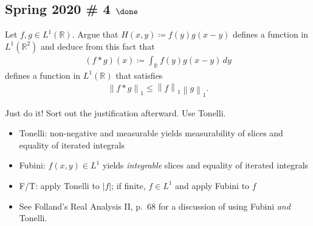 \hypertarget{spring-2020-4-done}{%
\subsection{\texorpdfstring{Spring 2020 \# 4
\(\done\)}{Spring 2020 \# 4 \textbackslash done}}\label{spring-2020-4-done}}

Let \(f, g\in L^1({\mathbb{R}})\). Argue that
\(H(x, y) \coloneqq f(y) g(x-y)\) defines a function in
\(L^1({\mathbb{R}}^2)\) and deduce from this fact that
\begin{align*}
(f\ast g)(x) \coloneqq\int_{\mathbb{R}}f(y) g(x-y) \,dy
\end{align*}
defines a function in \(L^1({\mathbb{R}})\) that satisfies
\begin{align*}
{\left\lVert {f\ast g} \right\rVert}_1 \leq {\left\lVert {f} \right\rVert}_1 {\left\lVert {g} \right\rVert}_1
.\end{align*}

\begin{strategy}

Just do it! Sort out the justification afterward. Use Tonelli.

\end{strategy}

\begin{concept}

\envlist

\begin{itemize}
\tightlist
\item
  Tonelli: non-negative and measurable yields measurability of slices
  and equality of iterated integrals
\item
  Fubini: \(f(x, y) \in L^1\) yields \emph{integrable} slices and
  equality of iterated integrals
\item
  F/T: apply Tonelli to \({\left\lvert {f} \right\rvert}\); if finite,
  \(f\in L^1\) and apply Fubini to \(f\)
\item
  See Folland's Real Analysis II, p.~68 for a discussion of using Fubini
  \emph{and} Tonelli.
\end{itemize}

\end{concept}

